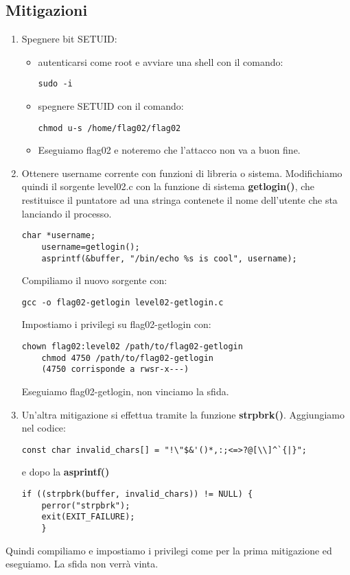 \subsection{Mitigazioni}
\begin{enumerate}
    \item Spegnere bit SETUID:
    \begin{itemize}
        \item autenticarsi come root e avviare una shell con il comando: \begin{lstlisting}[style=bashstyle] 
        sudo -i
        \end{lstlisting}
        \item spegnere SETUID con il comando: \begin{lstlisting}[style=bashstyle] 
        chmod u-s /home/flag02/flag02
        \end{lstlisting}   
        \item Eseguiamo flag02 e noteremo che l'attacco non va a buon fine. 
    \end{itemize}
    \item Ottenere username corrente con funzioni di libreria o sistema. Modifichiamo quindi il sorgente level02.c con la funzione di sistema \textbf{getlogin()}, che restituisce il puntatore ad una stringa contenete il nome dell'utente che sta lanciando il processo.
    \begin{lstlisting}[style=cstyle]
    char *username; 
    username=getlogin(); 
    asprintf(&buffer, "/bin/echo %s is cool", username);
    \end{lstlisting}
    Compiliamo il nuovo sorgente con:
    \begin{lstlisting}[style=bashstyle]
    gcc -o flag02-getlogin level02-getlogin.c
    \end{lstlisting}
    Impostiamo i privilegi su flag02-getlogin con:
    \begin{lstlisting}[style=bashstyle]
    chown flag02:level02 /path/to/flag02-getlogin 
    chmod 4750 /path/to/flag02-getlogin
    (4750 corrisponde a rwsr-x---)
    \end{lstlisting}
    Eseguiamo flag02-getlogin, non vinciamo la sfida.
    \item Un’altra mitigazione si effettua tramite la funzione \textbf{strpbrk()}. Aggiungiamo nel codice:
    \begin{lstlisting}[style=cstyle]
    const char invalid_chars[] = "!\"$&'()*,:;<=>?@[\\]^`{|}";
    \end{lstlisting}
    e dopo la \textbf{asprintf()}
    \begin{lstlisting}[style=cstyle]
    if ((strpbrk(buffer, invalid_chars)) != NULL) { 
    perror("strpbrk"); 
    exit(EXIT_FAILURE); 
    }
    \end{lstlisting}
\end{enumerate}
Quindi compiliamo e impostiamo i privilegi come per la prima mitigazione ed eseguiamo. La sfida non verrà vinta.

